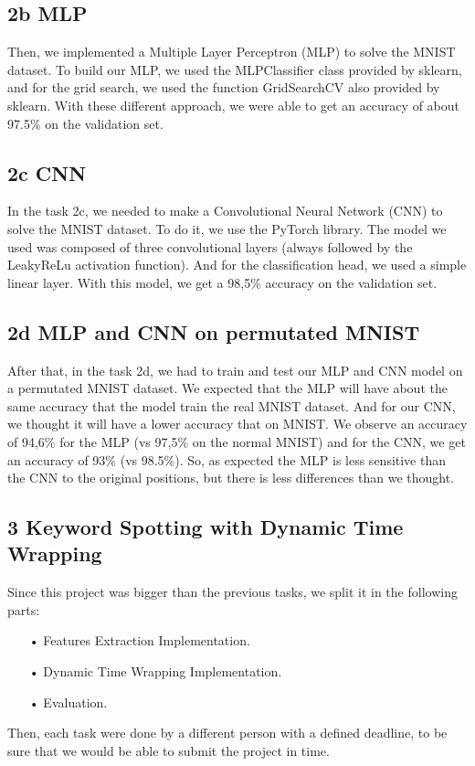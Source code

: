 \documentclass[12pt]{article}
\begin{document}
\subsection*{2b MLP}
Then, we implemented a Multiple Layer Perceptron (MLP) to solve the MNIST dataset. To build our MLP, we used the MLPClassifier class provided by sklearn, and for the grid search, we used the function GridSearchCV also provided by sklearn. With these different approach, we were able to get an accuracy of about 97.5\% on the validation set.
\subsection*{2c CNN}
In the task 2c, we needed to make a Convolutional Neural Network (CNN) to solve the MNIST dataset. To do it, we use the PyTorch library. The model we used was composed of three convolutional layers (always followed by the LeakyReLu activation function). And for the classification head, we used a simple linear layer.
With this model, we get a 98,5\% accuracy on the validation set.
\subsection*{2d MLP and CNN on permutated MNIST}
After that, in the task 2d, we had to train and test our MLP and CNN model on a permutated MNIST dataset. We expected that the MLP will have about the same accuracy that the model train  the real MNIST dataset. And for our CNN, we thought it will have a lower accuracy that on MNIST.
\newline We observe an accuracy of 94,6\% for the MLP (vs 97,5\% on the normal MNIST) and for the CNN, we get an accuracy of 93\% (vs 98.5\%). So, as expected the MLP is less sensitive than the CNN to the original positions, but there is less differences than we thought.

\subsection*{3 Keyword Spotting with Dynamic Time Wrapping}

Since this project was bigger than the previous tasks, we split it in the following parts:
\begin{enumerate}
\item[•]Features Extraction Implementation.
\item[•]Dynamic Time Wrapping Implementation.
\item[•]Evaluation.
\end{enumerate}
Then, each task were done by a different person with a defined deadline, to be sure that we would be able to submit the project in time.
\end{document}
